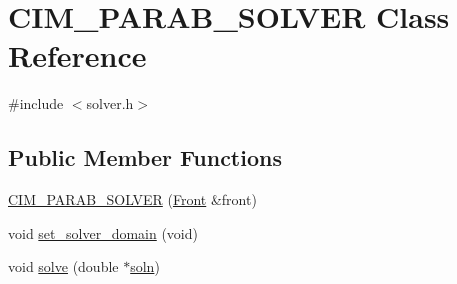 \hypertarget{class_c_i_m___p_a_r_a_b___s_o_l_v_e_r}{}\section{C\+I\+M\+\_\+\+P\+A\+R\+A\+B\+\_\+\+S\+O\+L\+V\+ER Class Reference}
\label{class_c_i_m___p_a_r_a_b___s_o_l_v_e_r}


{\ttfamily \#include $<$solver.\+h$>$}

\subsection*{Public Member Functions}
\begin{DoxyCompactItemize}
\item 
\hyperlink{class_c_i_m___p_a_r_a_b___s_o_l_v_e_r_a58eac9dcacc7052460acfc947c276deb}{C\+I\+M\+\_\+\+P\+A\+R\+A\+B\+\_\+\+S\+O\+L\+V\+ER} (\hyperlink{fdecs_8h_ac32202b798f848095c489cfd04c4ca5f}{Front} \&front)
\item 
void \hyperlink{class_c_i_m___p_a_r_a_b___s_o_l_v_e_r_add64dd2106f612e2bd987198447eb907}{set\+\_\+solver\+\_\+domain} (void)
\item 
void \hyperlink{class_c_i_m___p_a_r_a_b___s_o_l_v_e_r_aeaf60103da35e66e997e680d8d8437cc}{solve} (double $\ast$\hyperlink{class_c_i_m___p_a_r_a_b___s_o_l_v_e_r_a98498dd04c9005638265c76ea997495e}{soln})
\end{DoxyCompactItemize}
